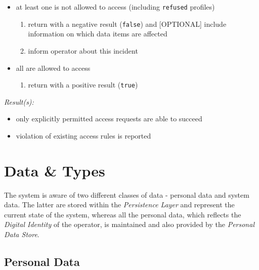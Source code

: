 \documentclass[12pt,english,a4paper,titlepage,cleardoublepage=empty,dottedtoc]{report}
\providecommand{\tightlist}{%
  \setlength{\itemsep}{0pt}\setlength{\parskip}{0pt}}
\begin{document}
\begin{enumerate}
\begin{itemize}
    \begin{itemize}
    \tightlist
    \item
      at least one is not allowed to access (including \texttt{refused}
      profiles)

      \begin{enumerate}
      \def\labelenumii{\arabic{enumii})}
      \tightlist
      \item
        return with a negative result (\texttt{false}) and
        {[}OPTIONAL{]} include information on which data items are
        affected
      \item
        inform operator about this incident
      \end{enumerate}
    \item
      all are allowed to access

      \begin{enumerate}
      \def\labelenumii{\arabic{enumii})}
      \tightlist
      \item
        return with a positive result (\texttt{true})
      \end{enumerate}
    \end{itemize}
  \end{itemize}
\end{enumerate}

\emph{Result(s):}

\begin{itemize}
\tightlist
\item
  only explicitly permitted access requests are able to succeed
\item
  violation of existing access rules is reported
\end{itemize}

\section{Data \& Types}\label{data-types}

The system is aware of two different classes of data - personal data and
system data. The latter are stored within the \emph{Persistence Layer}
and represent the current state of the system, whereas all the personal
data, which reflects the \emph{Digital Identity} of the operator, is
maintained and also provided by the \emph{Personal Data Store}.

\subsection{Personal Data}\label{personal-data}
\end{document}
